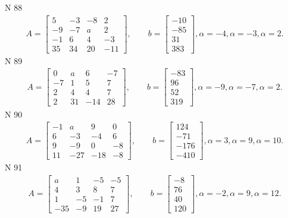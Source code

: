 \documentclass[11pt]{report}
\begin{document}
N 88
\begin{align*}
 A = \left[\begin{matrix}5 & -3 & -8 & 2\\-9 & -7 & a & 2\\-1 & 6 & 4 & -3\\35 & 34 & 20 & -11\end{matrix}\right],
    \qquad b = \left[\begin{matrix}-10\\-85\\31\\383\end{matrix}\right], \alpha = -4, \alpha = -3, \alpha = 2. 
 \end{align*}
N 89
\begin{align*}
 A = \left[\begin{matrix}0 & a & 6 & -7\\-7 & 1 & 5 & 7\\2 & 4 & 4 & 7\\2 & 31 & -14 & 28\end{matrix}\right],
    \qquad b = \left[\begin{matrix}-83\\96\\52\\319\end{matrix}\right], \alpha = -9, \alpha = -7, \alpha = 2. 
 \end{align*}
N 90
\begin{align*}
 A = \left[\begin{matrix}-1 & a & 9 & 0\\6 & -3 & -4 & 6\\9 & -9 & 0 & -8\\11 & -27 & -18 & -8\end{matrix}\right],
    \qquad b = \left[\begin{matrix}124\\-71\\-176\\-410\end{matrix}\right], \alpha = 3, \alpha = 9, \alpha = 10. 
 \end{align*}
N 91
\begin{align*}
 A = \left[\begin{matrix}a & 1 & -5 & -5\\4 & 3 & 8 & 7\\1 & -5 & -1 & 7\\-35 & -9 & 19 & 27\end{matrix}\right],
    \qquad b = \left[\begin{matrix}-8\\76\\40\\120\end{matrix}\right], \alpha = -2, \alpha = 9, \alpha = 12. 
 \end{align*}
\end{document}
